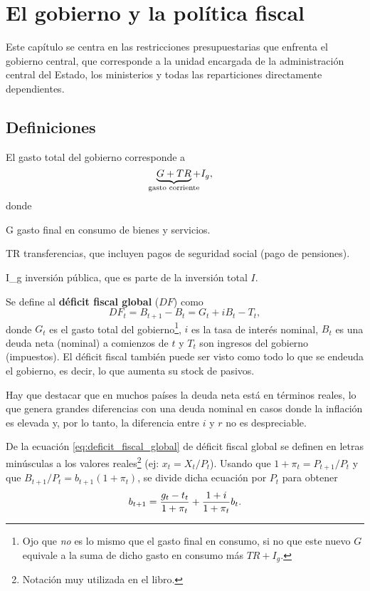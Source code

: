 \documentclass[DeGregorioResumen]{subfiles}
\begin{document}
\section{El gobierno y la política fiscal}

Este capítulo se centra en las restricciones presupuestarias que enfrenta el gobierno central, que corresponde a la unidad encargada de la administración central del Estado, los ministerios y todas las reparticiones directamente dependientes.

\subsection{Definiciones}

El gasto total del gobierno corresponde a
\begin{equation*}
\underbrace{G+TR}_{\mathclap{\text{gasto corriente}}}+I_g,
\end{equation*}
donde
\begin{where}
\item[G] gasto final en consumo de bienes y servicios.
\item[TR] transferencias, que incluyen pagos de seguridad social (pago de pensiones).
\item[I_g] inversión pública, que es parte de la inversión total $I$.
\end{where}

Se define al \textbf{déficit fiscal global} ($DF$) como
\begin{equation}
DF_t=B_{t+1}-B_t = G_t+iB_t-T_t,
\label{eq:deficit_fiscal_global}
\end{equation}
donde $G_t$ es el gasto total del gobierno\footnote{Ojo que \emph{no} es lo mismo que el gasto final en consumo, si no que este nuevo $G$ equivale a la suma de dicho gasto en consumo más $TR+I_g$.}, $i$ es la tasa de interés nominal, $B_t$ es una deuda neta (nominal) a comienzos de $t$ y $T_t$ son ingresos del gobierno (impuestos). El déficit fiscal también puede ser visto como todo lo que se endeuda el gobierno, es decir, lo que aumenta su stock de pasivos.

Hay que destacar que en muchos países la deuda neta está en términos reales, lo que genera grandes diferencias con una deuda nominal en casos donde la inflación es elevada y, por lo tanto, la diferencia entre $i$ y $r$ no es despreciable.

De la ecuación \eqref{eq:deficit_fiscal_global} de déficit fiscal global  se definen en letras minúsculas a los valores reales\footnote{Notación muy utilizada en el libro.} (ej: $x_t=X_t/P_t$). Usando que $1+\pi_t=P_{t+1}/P_t $ y que $B_{t+1}/P_t = b_{t+1}(1+\pi_t)$, se divide dicha ecuación por $P_t$ para obtener
\begin{equation*}
{b}_{t+1} = \frac{g_t-t_t}{1+\pi_t}+\frac{1+i}{1+\pi_t}b_t.
\end{equation*}
\end{document}
